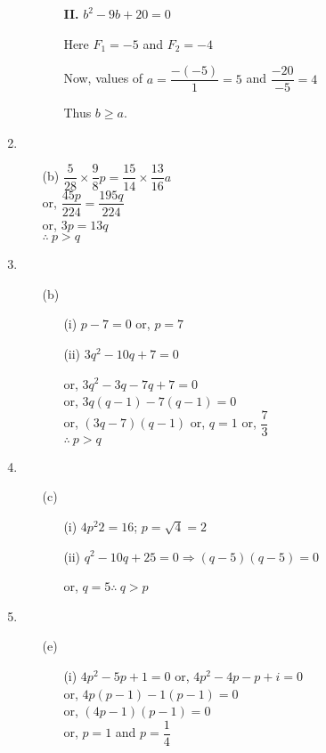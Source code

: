 \begin{multicols}{2}
\begin{enumerate}
\begin{itemize}
\begin{itemize}
    \item[{\bf II.}] $b^2 - 9b + 20 = 0$

      Here $F_1 = -5$ and $F_2 = -4$

      Now, values of $a = \dfrac{-(-5)}{1} = 5$ and $\dfrac{-20}{-5} = 4$

      Thus $b \geq a$.
      \end{itemize}
  \end{itemize}
\item
  \begin{itemize}
  \item[(b)] $\dfrac{5}{28} \times \dfrac{9}{8}p = \dfrac{15}{14} \times \dfrac{13}{16}a$\\
    or, $\dfrac{45p}{224} = \dfrac{195q}{224}$\\
    or, $3p = 13q$\\
    $\therefore~ p > q$
  \end{itemize}
\item
  \begin{itemize}
  \item[(b)]
    \begin{itemize}
    \item[(i)] $p - 7 = 0$ or, $p = 7$
    \item[(ii)] $3q^2 - 10q + 7 = 0$

      or, $3q^2 - 3q - 7q + 7 = 0$\\
      or, $3q(q - 1) -7(q - 1) = 0$\\
      or, $(3q - 7)(q - 1)$ or, $q = 1$ or, $\dfrac{7}{3}$\\
      $\therefore~ p > q$
      \end{itemize}
   \end{itemize}
\item
  \begin{itemize}
  \item[(c)]
    \begin{itemize}
    \item[(i)] $4p^{2}2 = 16$; $p = \sqrt{4} = 2$
    \item[(ii)] $q^2 - 10q + 25 = 0 \Rightarrow (q - 5)(q - 5) = 0$

      or, $q = 5 \therefore~ q > p$
      \end{itemize}
    \end{itemize}
\item
\begin{itemize}
\item[(e)]
  \begin{itemize}
  \item[(i)] $4p^2 - 5p + 1 = 0$ or, $4p^2 - 4p - p + i = 0$\\
    or, $4p(p - 1) -1(p - 1) = 0$\\
    or, $(4p - 1)(p - 1) = 0$\\
    or, $p = 1$ and $p = \dfrac{1}{4}$


\end{itemize}
\end{itemize}
\end{enumerate}
\end{multicols}

